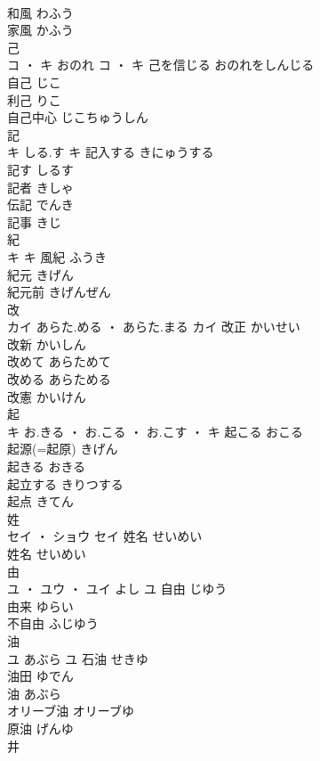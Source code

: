 \documentclass[8pt]{extreport}
\begin{document}
\begin{CJK}{UTF8}{min}
\\	和風	わふう	
\\	家風	かふう	
\\	己	
\\	コ ・ キ	おのれ	コ ・ キ	己を信じる	おのれをしんじる	
\\	自己	じこ	
\\	利己	りこ	
\\	自己中心	じこちゅうしん	
\\	記	
\\	キ	しる.す	キ	記入する	きにゅうする	
\\	記す	しるす	
\\	記者	きしゃ	
\\	伝記	でんき	
\\	記事	きじ	
\\	紀	
\\	キ		キ	風紀	ふうき	
\\	紀元	きげん	
\\	紀元前	きげんぜん	
\\	改	
\\	カイ	あらた.める ・ あらた.まる	カイ	改正	かいせい	
\\	改新	かいしん	
\\	改めて	あらためて	
\\	改める	あらためる	
\\	改憲	かいけん	
\\	起	
\\	キ	お.きる ・ お.こる ・ お.こす ・	キ	起こる	おこる	
\\	起源(=起原)	きげん	
\\	起きる	おきる	
\\	起立する	きりつする	
\\	起点	きてん	
\\	姓	
\\	セイ ・ ショウ		セイ	姓名	せいめい	
\\	姓名	せいめい	
\\	由	
\\	ユ ・ ユウ ・ ユイ	よし	ユ	自由	じゆう	
\\	由来	ゆらい	
\\	不自由	ふじゆう	
\\	油	
\\	ユ	あぶら	ユ	石油	せきゆ	
\\	油田	ゆでん	
\\	油	あぶら	
\\	オリーブ油	オリーブゆ	
\\	原油	げんゆ	
\\	井	

\end{CJK}
\end{document}
